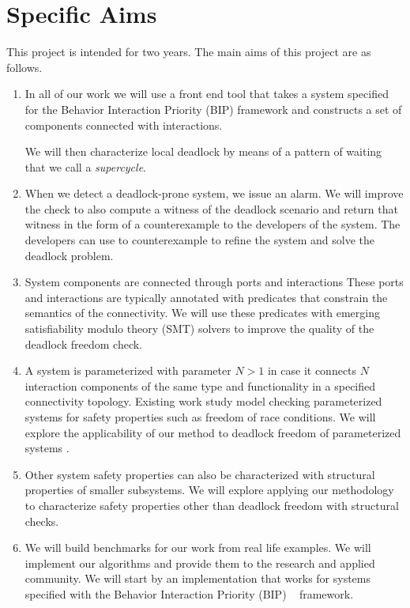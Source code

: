 \section{Specific Aims}
\label{sec:aims}

This project is intended for two years.
The main aims of this project are as follows.

\begin{enumerate}

\item 
In all of our work we will use a front end tool that
takes a system specified for the Behavior Interaction Priority (BIP)
framework and constructs a set of components connected 
with interactions. 



 We will then characterize local deadlock by
means of a pattern of waiting that we call a \emph{supercycle}.


\item 
When we detect a deadlock-prone system, we issue an alarm. 
We will improve the check to also compute a witness of the deadlock scenario 
and return that witness in the form of a counterexample 
to the developers of the system. 
The developers can use to counterexample to refine the system and solve
the deadlock problem. 

\item 
System components are connected through ports and interactions
These ports and interactions are typically annotated with predicates
that constrain the semantics of the connectivity. 
We will use these predicates with emerging satisfiability modulo theory (SMT) 
solvers to improve the quality of the deadlock freedom check.

		
\item 
A system is parameterized with parameter $N>1$ 
in case it connects $N$ interaction components of the 
same type and functionality in a specified connectivity topology. 
Existing work study model checking parameterized systems for safety properties
such as freedom of race conditions. 
We will explore the applicability of our method to deadlock freedom 
of parameterized systems
		. 

\item
Other system safety properties can also be characterized with structural 
properties of smaller subsystems. 
We will explore applying our methodology to characterize safety properties 
other than deadlock freedom with structural checks. 

\item 
We will build benchmarks for our work from real life examples.
We will implement our algorithms and provide them to the research and 
applied community. 
We will start by an implementation that works for systems specified with 
the Behavior Interaction Priority (BIP) ~\cite{bip06} framework.

\end{enumerate}


